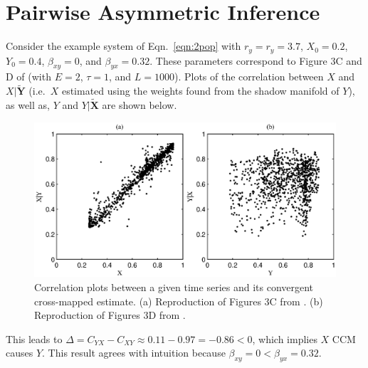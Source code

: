 \documentclass[twocolumn,aps,pre,groupedaddress]{revtex4-1}
\begin{document}
\section{Pairwise Asymmetric Inference}
\label{sec:PAI}

Consider the example system of Eqn.\ \ref{eqn:2pop} with $r_y=r_y=3.7$, $X_0 = 0.2$, $Y_0=0.4$, $\beta_{xy}=0$, and $\beta_{yx}=0.32$.  These parameters correspond to Figure 3C and D of \cite{Sugihara2012} (with $E=2$, $\tau=1$, and $L=1000$).  Plots of the correlation between $X$ and $X|\tilde{\mathbf{Y}}$ (i.e.\ $X$ estimated using the weights found from the shadow manifold of $Y$), as well as, $Y$ and $Y|\tilde{\mathbf{X}}$ are shown below.
\begin{figure}[ht]
\includegraphics[scale=0.5]{SugFig3CD.eps} 
\caption{Correlation plots between a given time series and its convergent cross-mapped estimate.  (a) Reproduction of Figures 3C from \cite{Sugihara2012}. (b) Reproduction of Figures 3D from \cite{Sugihara2012}.}
\label{fig:Sug3CDredo}
\end{figure}
This leads to $\Delta=C_{YX}-C_{XY}\approx 0.11 - 0.97 = -0.86 <0$, which implies $X$ CCM causes $Y$.  This result agrees with intuition because $\beta_{xy}=0 < \beta_{yx} = 0.32$.
\end{document}
